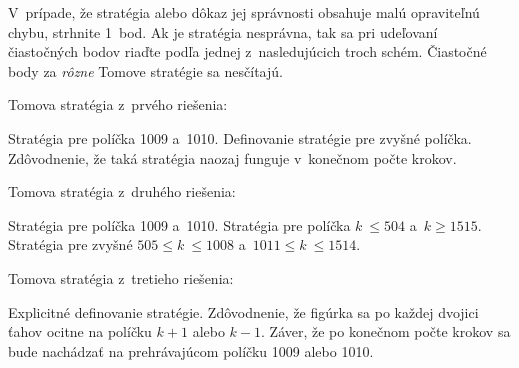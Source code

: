 {\Item V~prípade, že stratégia alebo dôkaz jej správnosti
obsahuje malú opraviteľnú chybu, strhnite 1~bod.
\Item Ak je stratégia nesprávna, tak sa pri udeľovaní
čiastočných bodov riaďte podľa jednej z~nasledujúcich troch schém.
\Item Čiastočné body za {\it rôzne\/} Tomove stratégie sa nesčítajú.

\Podnadpis Tomova stratégia z~prvého riešenia:

 Stratégia pre políčka 1009 a~1010.
 Definovanie stratégie pre zvyšné políčka.
 Zdôvodnenie, že taká stratégia naozaj funguje v~konečnom počte krokov.

\Podnadpis Tomova stratégia z~druhého riešenia:

 Stratégia pre políčka 1009 a~1010.
 Stratégia pre  políčka $k~\leq 504$ a~$k\ge 1515$.
 Stratégia pre zvyšné $505 \leq k~\leq 1008$ a~$1011\leq k~\leq 1514$.

\Podnadpis Tomova stratégia z~tretieho riešenia:

 Explicitné definovanie stratégie.
 Zdôvodnenie, že figúrka sa po každej dvojici ťahov
ocitne na políčku $k+1$ alebo $k-1$.
 Záver, že po konečnom počte krokov sa bude nachádzať
na prehrávajúcom políčku 1009 alebo 1010.

\EndSchema

\endpetit
\bigbreak}

